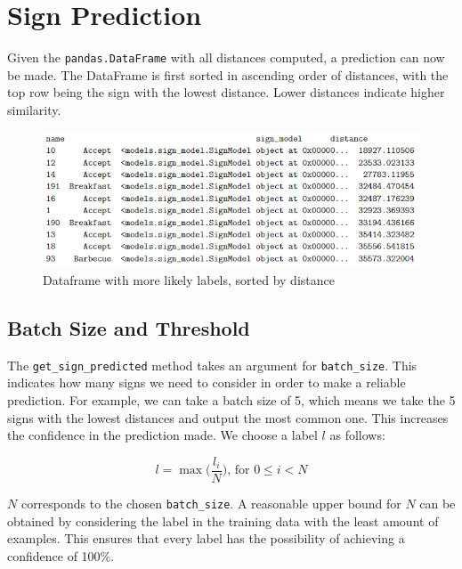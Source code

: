\documentclass[final,rdr32.tex]{subfiles}
\begin{document}
\section{Sign Prediction}

Given the \verb|pandas.DataFrame| with all distances computed, a prediction can now be made. The DataFrame is first sorted in ascending order of distances, with the top row being the sign with the lowest distance. Lower distances indicate higher similarity.

\begin{figure}[H]
    \begin{center}
        \includegraphics[scale=1]{images/dataframe.png}
        \caption{Dataframe with more likely labels, sorted by distance}
    \end{center}
\end{figure}

\subsection{Batch Size and Threshold}
\label{sec:batch}

The \verb|get_sign_predicted| method takes an argument for \verb|batch_size|. This indicates how many signs we need to consider in order to make a reliable prediction. For example, we can take a batch size of 5, which means we take the 5 signs with the lowest distances and output the most common one. This increases the confidence in the prediction made. We choose a label $l$ as follows:

\begin{equation*}
    l = \max\Big(\frac{l_i}{N}\Big) \text{, for $0 \leq i < N$}
\end{equation*}

$N$ corresponds to the chosen \verb|batch_size|. A reasonable upper bound for $N$ can be obtained by considering the label in the training data with the least amount of examples. This ensures that every label has the possibility of achieving a confidence of 100\%.
\end{document}
